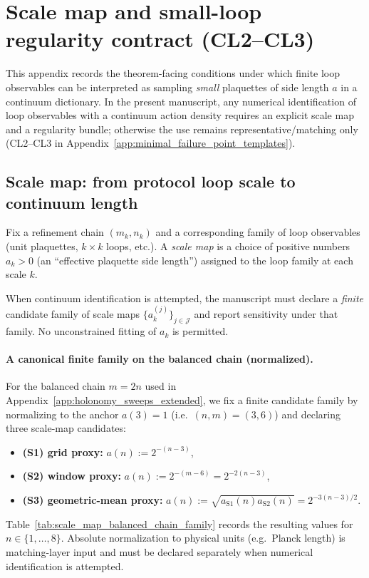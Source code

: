 \section{Scale map and small-loop regularity contract (CL2--CL3)}
\label{app:scale_map_and_small_loop_regularity_contract}

This appendix records the theorem-facing conditions under which finite loop observables can be interpreted as sampling \emph{small} plaquettes of side length $a$ in a continuum dictionary.
In the present manuscript, any numerical identification of loop observables with a continuum action density requires an explicit scale map and a regularity bundle; otherwise the use remains representative/matching only (CL2--CL3 in Appendix~\ref{app:minimal_failure_point_templates}).

\subsection{Scale map: from protocol loop scale to continuum length}
\begin{definition}
\label{def:scale_map_protocol_to_continuum}
\MathTag Fix a refinement chain $(m_k,n_k)$ and a corresponding family of loop observables (unit plaquettes, $k\times k$ loops, etc.).
A \emph{scale map} is a choice of positive numbers $a_{k}>0$ (an ``effective plaquette side length'') assigned to the loop family at each scale $k$.
\end{definition}

\begin{assumption}
\label{ass:bounded_scale_map_family}
\AuditTag When continuum identification is attempted, the manuscript must declare a \emph{finite} candidate family of scale maps $\{a_k^{(j)}\}_{j\in\mathcal{J}}$ and report sensitivity under that family.
No unconstrained fitting of $a_k$ is permitted.
\end{assumption}

\paragraph{A canonical finite family on the balanced chain (normalized).}
\AuditTag For the balanced chain $m=2n$ used in Appendix~\ref{app:holonomy_sweeps_extended}, we fix a finite candidate family by normalizing to the anchor $a(3)=1$ (i.e.\ $(n,m)=(3,6)$) and declaring three scale-map candidates:
\begin{itemize}
\item \textbf{(S1) grid proxy:} $a(n):=2^{-(n-3)}$,
\item \textbf{(S2) window proxy:} $a(n):=2^{-(m-6)}=2^{-2(n-3)}$,
\item \textbf{(S3) geometric-mean proxy:} $a(n):=\sqrt{a_{\mathrm{S1}}(n)a_{\mathrm{S2}}(n)}=2^{-3(n-3)/2}$.
\end{itemize}
Table~\ref{tab:scale_map_balanced_chain_family} records the resulting values for $n\in\{1,\dots,8\}$.
Absolute normalization to physical units (e.g.\ Planck length) is matching-layer input and must be declared separately when numerical identification is attempted.

